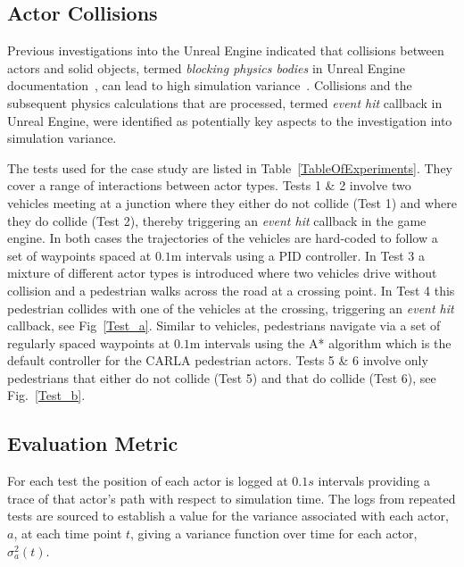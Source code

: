 \documentclass[runningheads,twocolumn,a4paper,10pt]{llncs}
\begin{document}
\subsection{Actor Collisions}\label{S:Actor_Collisions}
Previous investigations into the Unreal Engine indicated that collisions between actors and solid objects, termed \textit{blocking physics bodies} in Unreal Engine documentation~\cite{collision_overview}, can lead to high simulation variance~\cite{TSLUnrealEngineTesting}. 
%
Collisions and the subsequent physics calculations that are processed, termed \textit{event hit} callback in Unreal Engine, were identified as potentially key aspects to the investigation into simulation variance.

The tests used for the case study are listed in Table~\ref{TableOfExperiments}. They cover a range of interactions between actor types. 
%
Tests 1 \& 2 involve two vehicles meeting at a junction where they either do not collide (Test 1) and where they do collide (Test 2), thereby triggering an \textit{event hit} callback in the game engine. In both cases the trajectories of the vehicles are hard-coded to follow a set of waypoints spaced at $0.1$m 
intervals using a PID controller. 
%
In Test 3 a mixture of different actor types is introduced where two vehicles drive without collision and a pedestrian walks across the road at a crossing point. 
%
In Test 4 this pedestrian collides with one of the vehicles at the crossing, triggering an \textit{event hit} callback, see Fig~\ref{Test_a}. Similar to vehicles, pedestrians navigate via a set of regularly spaced waypoints at $0.1$m intervals using the A* algorithm which is the default controller for the CARLA pedestrian actors. Tests 5 \& 6 involve only pedestrians that either do not collide (Test 5) and that do collide (Test 6), see Fig.~\ref{Test_b}. 




\subsection{Evaluation Metric}\label{s:Experiment_Description}
For each test the position of each actor is logged at $0.1s$ intervals providing a trace of that actor's path with respect to simulation time. 
%
The logs from repeated tests are sourced to establish a value for the variance associated with each actor, $a$, at each time point $t$, giving a variance function over time for each actor, $\sigma_a^{2}(t)$.
\end{document}
